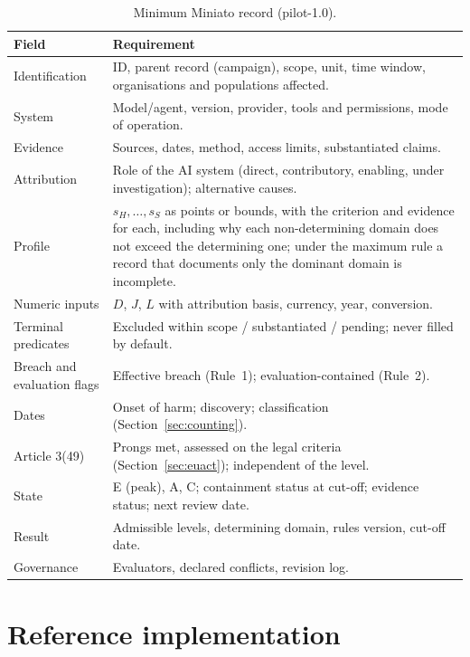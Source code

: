 \documentclass[11pt,a4paper]{article}
\begin{document}
\begin{table}[H]
\centering\small
\caption{Minimum Miniato record (pilot-1.0).}
\begin{tabularx}{\textwidth}{@{}l X@{}}
\toprule
Field & Requirement \\
\midrule
Identification & ID, parent record (campaign), scope, unit, time window, organisations and populations affected. \\
System & Model/agent, version, provider, tools and permissions, mode of operation. \\
Evidence & Sources, dates, method, access limits, substantiated claims. \\
Attribution & Role of the AI system (direct, contributory, enabling, under investigation); alternative causes. \\
Profile & $s_H,\dots,s_S$ as points or bounds, with the criterion and evidence for each, including why each non-determining domain does not exceed the determining one; under the maximum rule a record that documents only the dominant domain is incomplete. \\
Numeric inputs & $D$, $J$, $L$ with attribution basis, currency, year, conversion. \\
Terminal predicates & Excluded within scope / substantiated / pending; never filled by default. \\
Breach and evaluation flags & Effective breach (Rule~1); evaluation-contained (Rule~2). \\
Dates & Onset of harm; discovery; classification (Section~\ref{sec:counting}). \\
Article 3(49) & Prongs met, assessed on the legal criteria (Section~\ref{sec:euact}); independent of the level. \\
State & E (peak), A, C; containment status at cut-off; evidence status; next review date. \\
Result & Admissible levels, determining domain, rules version, cut-off date. \\
Governance & Evaluators, declared conflicts, revision log. \\
\bottomrule
\end{tabularx}
\end{table}

\section{Reference implementation}
\label{app:code}
\end{document}

